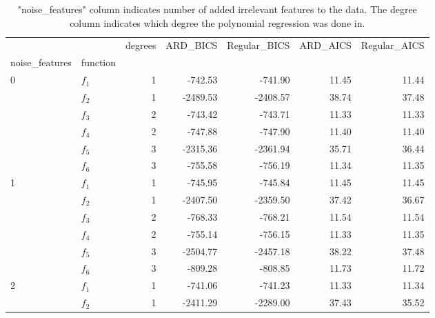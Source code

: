 \documentclass[12pt]{article}
\begin{document}
        \begin{table}[H]
            \centering
            \caption{"noise\_features" column indicates number of added irrelevant features to the data. The degree column indicates which degree the polynomial regression was done in.}
            \begin{tabular}{llrrrrr}
                \toprule
                  &       &  degrees &  ARD\_BICS &  Regular\_BICS &  ARD\_AICS &  Regular\_AICS \\
                noise\_features & function &          &           &               &           &               \\
                \midrule
                0 & $f_1$ &        1 &   -742.53 &       -741.90 &     11.45 &         11.44 \\
                & $f_2$ &        1 &  -2489.53 &      -2408.57 &     38.74 &         37.48 \\
                & $f_3$ &        2 &   -743.42 &       -743.71 &     11.33 &         11.33 \\
                & $f_4$ &        2 &   -747.88 &       -747.90 &     11.40 &         11.40 \\
                & $f_5$ &        3 &  -2315.36 &      -2361.94 &     35.71 &         36.44 \\
                & $f_6$ &        3 &   -755.58 &       -756.19 &     11.34 &         11.35 \\
                \midrule
                1 & $f_1$ &        1 &   -745.95 &       -745.84 &     11.45 &         11.45 \\
                & $f_2$ &        1 &  -2407.50 &      -2359.50 &     37.42 &         36.67 \\
                & $f_3$ &        2 &   -768.33 &       -768.21 &     11.54 &         11.54 \\
                & $f_4$ &        2 &   -755.14 &       -756.15 &     11.33 &         11.35 \\
                & $f_5$ &        3 &  -2504.77 &      -2457.18 &     38.22 &         37.48 \\
                & $f_6$ &        3 &   -809.28 &       -808.85 &     11.73 &         11.72 \\
                \midrule
                2 & $f_1$ &        1 &   -741.06 &       -741.23 &     11.33 &         11.34 \\
                & $f_2$ &        1 &  -2411.29 &      -2289.00 &     37.43 &         35.52 \\

\end{tabular}
\end{table}
\end{document}
